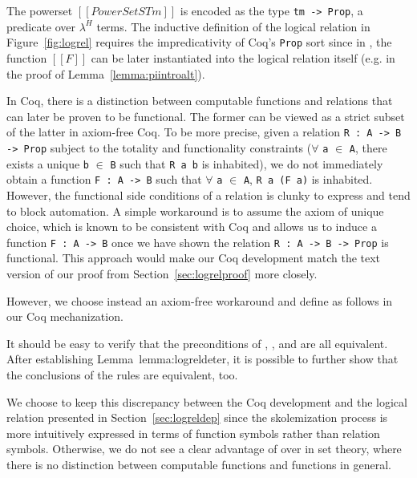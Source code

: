 \documentclass[acmsmall]{acmart}
\newcommand{\lang}{$\lambda^H$\xspace}
\begin{document}
The powerset $[[PowerSet STm]]$ is encoded as the type \texttt{tm ->
Prop}, a predicate over \lang{} terms.
The inductive
definition of the logical relation in Figure~\ref{fig:logrel} requires
the impredicativity of Coq's \texttt{Prop} sort since in ,
the function $[[F]]$ can be later instantiated into the logical
relation itself (e.g. in the proof of Lemma~\ref{lemma:piintroalt}).

In Coq, there is a distinction between computable functions and
relations that can later be proven to be functional. The former can be
viewed as a strict subset of the latter in axiom-free Coq. To be more
precise, given a relation \texttt{R : A -> B -> Prop} subject to the
totality and functionality constraints ($\forall$ \texttt{a} $\in$
\texttt{A}, there exists a unique \texttt{b} $\in$ \texttt{B} such
that \texttt{R a b} is inhabited), we do not immediately obtain a function
\texttt{F : A -> B} such that $\forall$ \texttt{a} $\in$ \texttt{A},
\texttt{R a (F a)} is inhabited. However, the functional side
conditions of a relation is clunky to express and tend to block
automation. A simple workaround is to assume the axiom of unique choice, which
is known to be consistent with Coq and allows us to induce a function \texttt{F
: A -> B} once we have shown the relation \texttt{R : A -> B -> Prop}
is functional. This approach would make our Coq development match
the text version of our proof from Section~\ref{sec:logrelproof} more
closely.

However, we choose instead an axiom-free workaround and define
 as follows in our Coq mechanization.
\begin{center}
\end{center}
It should be easy to verify that the preconditions of
, , and  are all
equivalent. After establishing Lemma~{lemma:logreldeter}, it is
possible to further show that the conclusions of the rules are
equivalent, too.

We choose to keep this discrepancy between the Coq development and the
logical relation presented in Section~\ref{sec:logreldep} since the
skolemization process is more intuitively expressed in terms of
function symbols rather than relation symbols. Otherwise, we do not
see a clear advantage of  over  in set
theory, where there is no distinction between computable functions and
functions in general.
\end{document}
